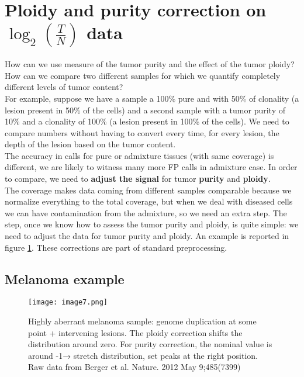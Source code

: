 \section{Ploidy and purity correction on $\log_2(\frac{T}{N})$ data}
How can we use measure of the tumor purity and the effect of the tumor ploidy? How can we compare two different samples for which we quantify completely different levels of tumor content?
\\
For example, suppose we have a sample a 100\% pure and with 50\% of clonality (a lesion present in 50\% of the cells) and a second sample with a tumor purity of 10\% and a clonality of 100\% (a lesion present in 100\% of the cells). We need to compare numbers without having to convert every time, for every lesion, the depth of the lesion based on the tumor content.
\\
The accuracy in calls for pure or admixture tissues (with same coverage) is different, we are likely to witness many more FP calls in admixture case. In order to compare, we need to \textbf{adjust the signal} for tumor \textbf{purity} and \textbf{ploidy}.
\\
The coverage makes data coming from different samples comparable because we normalize everything to the total coverage, but when we deal with diseased cells we can have contamination from the admixture, so we need an extra step. The step, once we know how to assess the tumor purity and ploidy, is quite simple: we need to adjust the data for tumor purity and ploidy. An example is reported in figure \ref{fig:ploidy1}. These corrections are part of standard preprocessing.

\subsection{Melanoma example}

\begin{figure}[H]
\centering
\texttt{[image: image7.png]}
\caption{Highly aberrant melanoma sample: genome duplication at some point + intervening lesions. The ploidy correction shifts the distribution around zero. For purity correction, the nominal value is around -1→ stretch distribution, set peaks at the right position.
Raw data from Berger et al. Nature. 2012 May 9;485(7399)}
\label{fig:ploidy1}
\end{figure}

